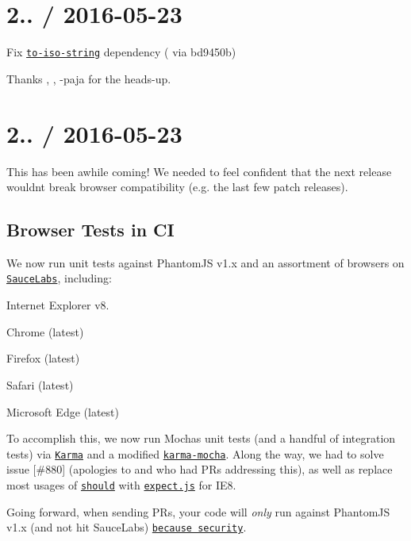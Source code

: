 \section*{2.. / 2016-\/05-\/23}


\begin{DoxyItemize}
\item Fix \href{https://npmjs.com/package/to-iso-string}{\tt to-\/iso-\/string} dependency (\href{https://github.com/boneskull}{\tt } via bd9450b)
\end{DoxyItemize}

Thanks , , -\/paja for the heads-\/up.

\section*{2.. / 2016-\/05-\/23}

This has been awhile coming! We needed to feel confident that the next release wouldn\textquotesingle{}t break browser compatibility (e.\+g. the last few patch releases).

\subsection*{Browser Tests in CI}

We now run unit tests against Phantom\+JS v1.\+x and an assortment of browsers on \href{https://saucelabs.com}{\tt Sauce\+Labs}, including\+:


\begin{DoxyItemize}
\item Internet Explorer v8.
\item Chrome (latest)
\item Firefox (latest)
\item Safari (latest)
\item Microsoft Edge (latest)
\end{DoxyItemize}

To accomplish this, we now run Mocha\textquotesingle{}s unit tests (and a handful of integration tests) via \href{https://npmjs.com/package/karma}{\tt Karma} and a modified \href{https://npmjs.com/package/karma-mocha}{\tt karma-\/mocha}. Along the way, we had to solve issue \mbox{[}\#880\mbox{]} (apologies to  and  who had P\+Rs addressing this), as well as replace most usages of \href{https://npmjs.com/package/should}{\tt should} with \href{https://npmjs.com/package/expect.js}{\tt expect.\+js} for I\+E8.

Going forward, when sending P\+Rs, your code will {\itshape only} run against Phantom\+JS v1.\+x (and not hit Sauce\+Labs) \href{https://docs.travis-ci.com/user/pull-requests/#Security-Restrictions-when-testing-Pull-Requests}{\tt because security}.

